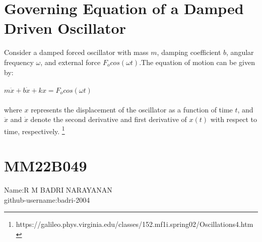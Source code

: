 \documentclass{article}
\begin{document}
\section{Governing Equation of a Damped Driven Oscillator}
Consider a damped forced oscillator with mass $m$, damping coefficient $b$, angular frequency $\omega$, and external force \(F_ocos(\omega t)\).The equation of motion can be given by:\\\\
\textsc{\Large  \(m\ddot{x} + b\dot{x} + kx = F_ocos(\omega t)\)}\\\\

where $x$ represents the displacement of the oscillator as a function of time $t$, and $\ddot{x}$ and $\dot{x}$ denote the second derivative and first derivative of $x(t)$ with respect to time, respectively.
\footnote{https://galileo.phys.virginia.edu/classes/152.mf1i.spring02/Oscillations4.htm}
\section{MM22B049}
Name:R M BADRI NARAYANAN\\
github-username:badri-2004
\end{document}
